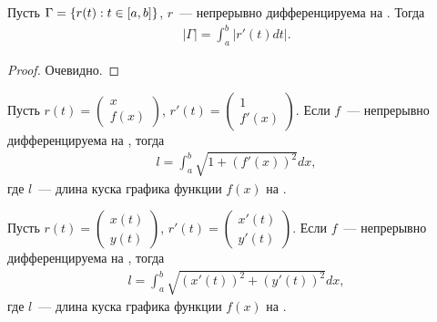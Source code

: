 \documentclass[../main.tex]{subfiles}
\begin{document}
\begin{proposition}
    Пусть $\Gamma = \{ r(t): t \in [a,b] \}$, $r$~--- непрерывно дифференцируема на \segab. Тогда  
    \begin{gather} 
        \left| \Gamma \right| = \int_{a}^{b} \left| r'(t) dt \right|.
    \end{gather}
\end{proposition}

\begin{proof}
    Очевидно.
\end{proof}

\begin{corollary}
    Пусть $r(t) = \begin{pmatrix}
    x \\ 
    f(x)
    \end{pmatrix}$, $r'(t) = \begin{pmatrix}
    1 \\ 
    f'(x)
    \end{pmatrix}$. Если $f$~--- непрерывно дифференцируема на \segab, тогда 
    \begin{gather} 
      l = \int_{a}^{b} \sqrt{1 + (f'(x))^2} dx,
    \end{gather}
    где $l$~--- длина куска графика функции $f(x)$ на \segab. 
\end{corollary}

\begin{corollary}
    Пусть $r(t) = \begin{pmatrix}
    x(t) \\ 
    y(t)
    \end{pmatrix}$, $r'(t) = \begin{pmatrix}
    x'(t) \\ 
    y'(t)
    \end{pmatrix}$. Если $f$~--- непрерывно дифференцируема на \segab, тогда 
    \begin{gather} 
      l = \int_{a}^{b} \sqrt{(x'(t))^2 + (y'(t))^2} dx,
    \end{gather}
    где $l$~--- длина куска графика функции $f(x)$ на \segab. 
\end{corollary}
\end{document}
